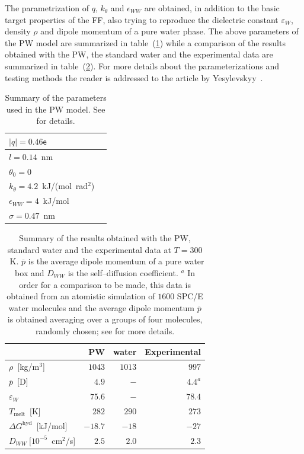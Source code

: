 The parametrization of $q$, $k_\theta$ and $\epsilon_{WW}$ are obtained, in addition to the basic target
properties of the \martini \ac{FF}, also trying to reproduce the dielectric constant $\varepsilon_{W}$, density
$\rho$ and dipole momentum of a pure water phase. The above parameters of the \ac{PW} model are summarized in
table~(\ref{tab:PWParam}) while a comparison of the results obtained with the \ac{PW}, the standard \martini
water and the experimental data are summarized in table~(\ref{tab:PWRes}). For more details about the
parameterizations and testing methods the reader is
addressed to the article by Yesylevskyy \etal\,\cite{PW}.
\begin{table}
	\centering
	\begin{tabular}{ll}
		\toprule
		$|q| = 0.46\mathsf{e}$				\\ \midrule
		$l = 0.14$~nm						\\ \midrule
		$\theta_0 = 0$						\\ \midrule
		$k_\theta = 4.2$~kJ/(mol\ rad$^2$)	\\ \midrule
		$\epsilon_{WW} = 4$~kJ/mol			\\ \midrule
		$\sigma = 0.47$~nm					\\ \bottomrule
	\end{tabular}
	\caption{Summary of the parameters used in the \acs{PW} model. See \cite{PW} for details.}
	\label{tab:PWParam}
\end{table}

\begin{table}
	\centering
	\begin{tabular}{lrrr}
		\toprule
		\,	& \acs{PW} &  \martini water & Experimental \\ \toprule
		$\rho$~[kg/m$^3$]				& $1043$  & $1013$  & $997$		\\ \midrule
		$\overline{p}$~[D] 				& $4.9$   & $-$ 	& $4.4^a$		\\ \midrule
		$\varepsilon_{W}$ 				& $75.6$  & $-$ 	& $78.4$	\\ \midrule
		$T_\text{melt}$~[K] 			& $282$   & $290$ 	& $273$		\\ \midrule
		$\Delta G^\text{hyd}$~[kJ/mol] 	& $-18.7$ &	$-18$	& $-27$		\\ \midrule%
		$D_{WW}~[10^{-5}$~cm$^2$/s]		& $2.5$   & $2.0$   & $2.3$		\\ \bottomrule
	\end{tabular}
	\caption{Summary of the results obtained with the \acs{PW}, standard \martini water and the experimental data at $T=300$~K. $\overline{p}$ is the average dipole momentum of a pure water box and $D_{WW}$ is the self--diffusion coefficient. \footnotesize $^a$ In order for a comparison to be made, this data is obtained from an atomistic simulation of $1600$ SPC/E water molecules and the average dipole momentum $\overline{p}$ is obtained averaging over a groups of four molecules, randomly chosen; see \cite{PW} for more details.}
	\label{tab:PWRes}
\end{table}

